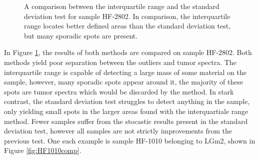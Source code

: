 \begin{figure}[h]

    \centering
    \qquad
    \caption{A comparison between the interquartile range and the standard deviation test for sample HF-2802. In comparison, the interquartile range locates better defined areas than the standard deviation test, but many sporadic spots are present.
\label{fig:HF2802comp}}%
\end{figure}
 

In Figure \ref{fig:HF2802comp}, the results of both methods are compared on sample HF-2802. Both methods yield poor separation between the outliers and tumor spectra. The interquartile range is capable of detecting a large mass of some material on the sample, however, many sporadic spots appear around it, the majority of these spots are tumor spectra which would be discarded by the method. In stark contrast, the standard deviation test struggles to detect anything in the sample, only yielding small spots in the larger areas found with the interquartiale range method.
Fewer samples suffer from the stocastic results present in the standard deviation test, however all samples are not strictly improvements from the previous test. One such example is sample HF-1010 belonging to LGm2, shown in Figure \ref{fig:HF1010comp}.

